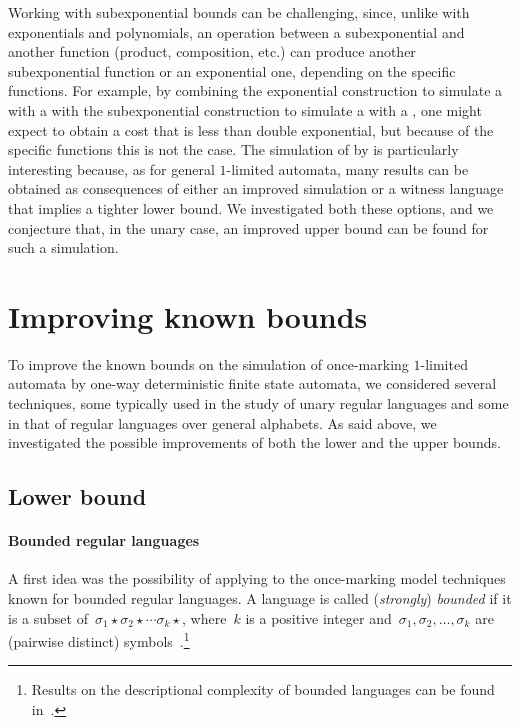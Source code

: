 Working with subexponential bounds can be challenging, since, unlike with exponentials and polynomials, an operation between a subexponential and another function (product, composition, etc.) can produce another subexponential function or an exponential one, depending on the specific functions.
For example, by combining the exponential construction to simulate a \OLA with a \ONFA with the subexponential construction to simulate a \ONFA with a \ODFA, one might expect to obtain a cost that is less than double exponential, but because of the specific functions this is not the case.
The simulation of \OMOLAs by \ODFAs is particularly interesting because, as for general $1$-limited automata, many results can be obtained as consequences of either an improved simulation or a witness language that implies a tighter lower bound.
We investigated both these options, and we conjecture that, in the unary case, an improved upper bound can be found for such a simulation.



\section{Improving known bounds}\label{sec:oncemarking-ideas}
To improve the known bounds on the simulation of once-marking $1$-limited automata by one-way deterministic finite state automata, we considered several techniques, some typically used in the study of unary regular languages and some in that of regular languages over general alphabets.
As said above, we investigated the possible improvements of both the lower and the upper bounds.


\subsection{Lower bound}

\paragraph{Bounded regular languages} A first idea was the possibility of applying to the once-marking model techniques known for bounded regular languages.
A language is called (\emph{strongly}) \emph{bounded} if it is a subset of~$\sigma_1\star\sigma_2\star\cdots\sigma_k\star$, where~$k$ is a positive integer and~$\sigma_1,\sigma_2,\dots,\sigma_k$ are (pairwise distinct) symbols~\cite{GinSpa66}.\footnote{%
	Results on the descriptional complexity of bounded languages can be found in~\cite{Gin66,MalPig13,IbaRav16,HerKut+17}.}

